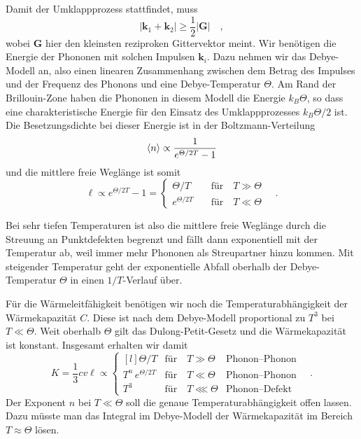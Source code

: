 Damit der Umklappprozess stattfindet, muss
\begin{equation}
    | \mathbf{k}_1 +  \mathbf{k}_2| \ge \frac{1}{2} | \mathbf{G} | \quad ,
\end{equation}
wobei $\mathbf{G}$ hier den kleinsten reziproken Gittervektor meint. Wir benötigen die Energie der Phononen mit solchen Impulsen $\mathbf{k}_i$. Dazu nehmen wir das Debye-Modell an, also einen linearen Zusammenhang zwischen dem Betrag des Impulses und der Frequenz des Phonons und eine Debye-Temperatur $\Theta$.  Am Rand der Brillouin-Zone haben die Phononen in diesem Modell die Energie $k_B \Theta$, so dass eine charakteristische Energie für den Einsatz des Umklappprozesses $k_B \Theta / 2$ ist. Die Besetzungsdichte bei dieser Energie ist in der Boltzmann-Verteilung
\begin{equation}
    \braket{n} \propto \frac{1}{e^{\Theta / 2T} -1}
\end{equation}
und die mittlere freie Weglänge ist somit
\begin{equation}
    \ell \propto e^{\Theta / 2T} -1 = 
    \left\{
    \begin{matrix*}
        \Theta / T             & \text{für} \quad T \gg \Theta  \\     
        e^{\Theta / 2T} \quad & \text{für} \quad T \ll \Theta 
    \end{matrix*}
    \right. \quad .
\end{equation}

Bei sehr tiefen Temperaturen ist also die mittlere freie Weglänge durch die Streuung an Punktdefekten begrenzt und fällt dann exponentiell mit der Temperatur ab, weil immer mehr Phononen als Streupartner hinzu kommen. Mit steigender Temperatur geht der exponentielle Abfall oberhalb der Debye-Temperatur $\Theta$ in einen $1/T$-Verlauf über.


Für die Wärmeleitfähigkeit benötigen wir noch die Temperaturabhängigkeit der Wärmekapazität $C$. Diese ist nach dem Debye-Modell proportional zu $T^3$ bei $T \ll \Theta$. Weit oberhalb $\Theta$ gilt das Dulong-Petit-Gesetz und die Wärmekapazität ist konstant. Insgesamt erhalten wir damit 
\begin{equation}
    K = \frac{1}{3} c v \ell  \propto 
    \left\{
    \begin{matrix*}[l]
        \Theta / T                    & \text{für} \quad T \gg \Theta    & \text{Phonon--Phonon}      \\
      T^n \,  e^{\Theta / 2T}        & \text{für} \quad T \ll \Theta    & \text{Phonon--Phonon}      \\
      T^3                            & \text{für} \quad T \lll \Theta   & \text{Phonon--Defekt}     
    \end{matrix*}
    \right. \quad .
\end{equation}
Der Exponent $n$ bei $ T \ll \Theta  $ soll die genaue Temperaturabhängigkeit offen lassen. Dazu müsste man das Integral im Debye-Modell der Wärmekapazität im Bereich $T \approx \Theta$ lösen. 

